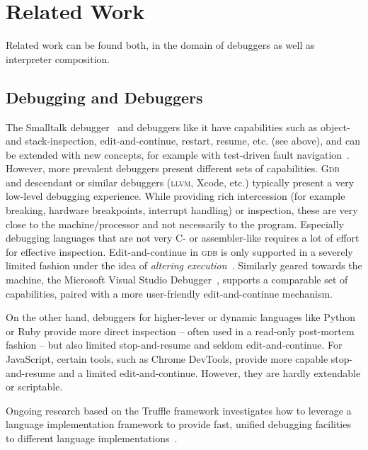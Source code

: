 \documentclass[sigconf,english]{acmart}
\begin{document}
\section{Related Work}
\label{sec:related-work}

Related work can be found both, in the domain of debuggers as well
as interpreter composition.

\subsection{Debugging and Debuggers}

The Smalltalk debugger~\cite{goldberg:1984:smalltalk-80:-interactive} and
debuggers like it have capabilities such as object- and stack-inspection,
edit-and-continue, restart, resume, etc. (see above), and can be extended with
new concepts, for example with test-driven fault
navigation~\cite{perscheid+:2012:test-driven-fault}. However, more prevalent
debuggers present different sets of capabilities.
\textsc{Gdb}~\cite{stallman+:2011:debugging-with} and descendant or similar
debuggers (\textsc{llvm}, Xcode, etc.) typically present a very low-level
debugging experience. While providing rich intercession (for example breaking,
hardware breakpoints, interrupt handling) or inspection, these are very close to
the machine\slash processor and not necessarily to the program. Especially
debugging languages that are not very C- or assembler-like requires a lot of
effort for effective inspection. Edit-and-continue in \textsc{gdb} is only
supported in a severely limited fashion under the idea of \emph{altering
  execution}~\cite[chapter 17]{stallman+:2011:debugging-with}. Similarly geared
towards the machine, the Microsoft Visual Studio
Debugger~\cite{microsoft:2017:debugging-visual}, supports a comparable set of
capabilities, paired with a more user-friendly edit-and-continue mechanism.

On the other hand, debuggers for higher-lever or dynamic languages like Python
or Ruby provide more direct inspection \--- often used in a read-only
post-mortem fashion \--- but also limited stop-and-resume and seldom
edit-and-continue. For JavaScript, certain tools, such as Chrome DevTools,
provide more capable stop-and-resume and a limited edit-and-continue. However,
they are hardly extendable or scriptable.

Ongoing research based on the Truffle framework investigates how to leverage a
language implementation framework to provide fast, unified debugging facilities
to different language
implementations~\cite{van-de-vanter:2015:building-debuggers,seaton+:2014:debugging-full}.
\end{document}
